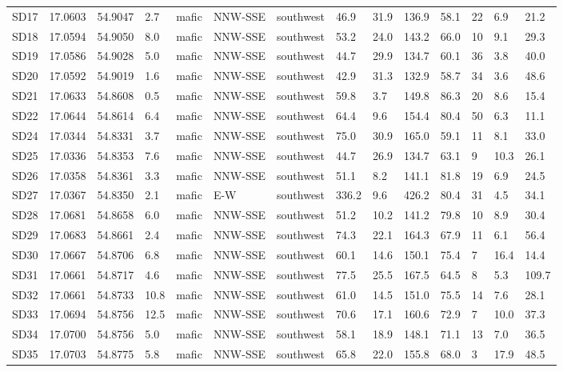 \begin{tabular}{llllllllllllll}
SD17 & 17.0603 & 54.9047 & 2.7 & mafic & NNW-SSE & southwest & 46.9 & 31.9 & 136.9 & 58.1 & 22 & 6.9 & 21.2 \\
SD18 & 17.0594 & 54.9050 & 8.0 & mafic & NNW-SSE & southwest   & 53.2 & 24.0 & 143.2 & 66.0 & 10 & 9.1 & 29.3 \\
SD19 & 17.0586 & 54.9028 & 5.0 & mafic & NNW-SSE & southwest & 44.7 & 29.9 & 134.7 & 60.1 & 36 & 3.8 & 40.0 \\
SD20 & 17.0592 & 54.9019 & 1.6 & mafic & NNW-SSE & southwest & 42.9 & 31.3 & 132.9 & 58.7 & 34 & 3.6 & 48.6 \\
SD21 & 17.0633 & 54.8608 & 0.5 & mafic & NNW-SSE & southwest & 59.8 & 3.7 & 149.8 & 86.3 & 20 & 8.6 & 15.4 \\
SD22 & 17.0644 & 54.8614 & 6.4 & mafic & NNW-SSE & southwest & 64.4 & 9.6 & 154.4 & 80.4 & 50 & 6.3 & 11.1 \\
SD24 & 17.0344 & 54.8331 & 3.7 & mafic & NNW-SSE & southwest & 75.0 & 30.9 & 165.0 & 59.1 & 11 & 8.1 & 33.0 \\
SD25 & 17.0336 & 54.8353 & 7.6 & mafic & NNW-SSE & southwest & 44.7 & 26.9 & 134.7 & 63.1 & 9 & 10.3 & 26.1 \\
SD26 & 17.0358 & 54.8361 & 3.3 & mafic & NNW-SSE & southwest & 51.1 & 8.2 & 141.1 & 81.8 & 19 & 6.9 & 24.5 \\
SD27 & 17.0367 & 54.8350 & 2.1 & mafic & E-W & southwest & 336.2 & 9.6 & 426.2 & 80.4 & 31 & 4.5 & 34.1 \\
SD28 & 17.0681 & 54.8658 & 6.0 & mafic & NNW-SSE & southwest & 51.2 & 10.2 & 141.2 & 79.8 & 10 & 8.9 & 30.4 \\
SD29 & 17.0683 & 54.8661 & 2.4 & mafic & NNW-SSE & southwest & 74.3 & 22.1 & 164.3 & 67.9 & 11 & 6.1 & 56.4 \\
SD30 & 17.0667 & 54.8706 & 6.8 & mafic & NNW-SSE & southwest & 60.1 & 14.6 & 150.1 & 75.4 & 7 & 16.4 & 14.4 \\
SD31 & 17.0661 & 54.8717 & 4.6 & mafic & NNW-SSE & southwest & 77.5 & 25.5 & 167.5 & 64.5 & 8 & 5.3 & 109.7 \\
SD32 & 17.0661 & 54.8733 & 10.8 & mafic & NNW-SSE & southwest & 61.0 & 14.5 & 151.0 & 75.5 & 14 & 7.6 & 28.1 \\
SD33 & 17.0694 & 54.8756 & 12.5 & mafic & NNW-SSE & southwest & 70.6 & 17.1 & 160.6 & 72.9 & 7 & 10.0 & 37.3 \\
SD34 & 17.0700 & 54.8756 & 5.0 & mafic & NNW-SSE & southwest & 58.1 & 18.9 & 148.1 & 71.1 & 13 & 7.0 & 36.5 \\
SD35 & 17.0703 & 54.8775 & 5.8 & mafic & NNW-SSE & southwest & 65.8 & 22.0 & 155.8 & 68.0 & 3 & 17.9 & 48.5 \\

\end{tabular}
